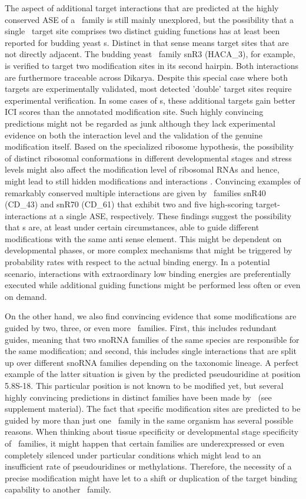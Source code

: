 The aspect of additional target interactions that are predicted at the
highly conserved ASE of a \sno\ family is still mainly unexplored, but the
possibility that a single \sno\ target site comprises two distinct
guiding functions has
at least been reported for budding yeast \haca s. Distinct in that
sense means target sites that are not directly adjacent. The
budding yeast \sno\ family snR3 (HACA\_3), for example, is
verified to target two modification sites in its second hairpin. Both
interactions are furthermore traceable across Dikarya. Despite this
special case where both targets are experimentally validated, most
detected 'double' target sites require experimental verification.
In some cases of \haca s, these additional targets gain better ICI
scores than the annotated modification site. Such highly
convincing predictions might not be regarded as junk although they
lack experimental evidence on both the interaction level and the
validation of the genuine modification itself. Based on the
specialized ribosome hypothesis, the possibility of distinct ribosomal
conformations in different developmental stages and stress levels
might also affect the modification level of ribosomal RNAs and hence,
might lead to still hidden modifications and interactions \citep{Xue:2012}.
Convincing examples of remarkably conserved multiple interactions are
given by \cd\ families snR40 (CD\_43) and snR70 (CD\_61) that exhibit two and five
high-scoring target-interactions at a single ASE, respectively.
These findings suggest the possibility
that \sno s are, at least under certain circumstances, able to guide
different modifications with the same anti sense element. This might
be dependent on developmental phases, or more complex mechanisms that
might be triggered by probability rates with respect to the actual
binding energy. In a potential scenario, interactions with
extraordinary low binding energies are preferentially executed while
additional guiding functions might be performed less often or even on
demand. 

On the other hand, we also find convincing evidence that some
modifications are guided by two, three, or
even more \sno\ families. First, this includes redundant guides, meaning that
two snoRNA families of the same species are responsible for the same
modification; and second, this includes single interactions that are split up over different
snoRNA families depending on the taxonomic lineage. A perfect example of the latter situation is given by the
predicted pseudouridine at position 5.8S-18. This particular
position is not known to be modified yet, but several highly convincing
predictions in distinct families have been made by \snoop\ (see supplement material).
The fact that specific modification sites are predicted
to be guided by more than just one \sno\ family in the same organism has several
possible reasons. When thinking about tissue specificity or
developmental stage specificity of \sno\ families, it might happen
that certain families are underexpressed or even completely silenced
under particular conditions which might lead to an insufficient
rate of pseudouridines or methylations. Therefore, the necessity of a precise
modification might have let to a shift or duplication of the target
binding capability to another \sno\ family. 

